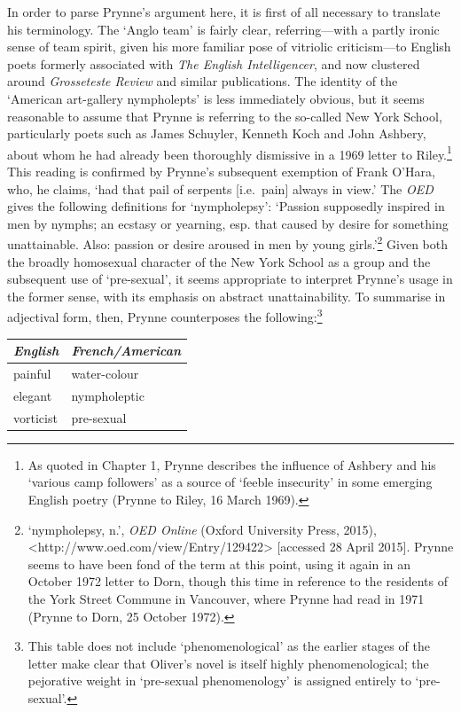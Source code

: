 \documentclass[]{article}
\begin{document}
In order to parse Prynne's argument here, it is first of all necessary
to translate his terminology. The `Anglo team' is fairly clear,
referring---with a partly ironic sense of team spirit, given his more
familiar pose of vitriolic criticism---to English poets formerly
associated with \emph{The English Intelligencer}, and now clustered
around \emph{Grosseteste Review} and similar publications. The identity
of the `American art-gallery nympholepts' is less immediately obvious,
but it seems reasonable to assume that Prynne is referring to the
so-called New York School, particularly poets such as James Schuyler,
Kenneth Koch and John Ashbery, about whom he had already been thoroughly
dismissive in a 1969 letter to Riley.\footnote{As quoted in Chapter 1,
  Prynne describes the influence of Ashbery and his `various camp
  followers' as a source of `feeble insecurity' in some emerging English
  poetry (Prynne to Riley, 16 March 1969).} This reading is confirmed by
Prynne's subsequent exemption of Frank O'Hara, who, he claims, `had that
pail of serpents {[}i.e.~pain{]} always in view.' The \emph{OED} gives
the following definitions for `nympholepsy': `Passion supposedly
inspired in men by nymphs; an ecstasy or yearning, esp. that caused by
desire for something unattainable. Also: passion or desire aroused in
men by young girls.'\footnote{`nympholepsy, n.', \emph{OED Online}
  (Oxford University Press, 2015),
  \textless{}http://www.oed.com/view/Entry/129422\textgreater{}
  {[}accessed 28 April 2015{]}. Prynne seems to have been fond of the
  term at this point, using it again in an October 1972 letter to Dorn,
  though this time in reference to the residents of the York Street
  Commune in Vancouver, where Prynne had read in 1971 (Prynne to Dorn,
  25 October 1972).} Given both the broadly homosexual character of the
New York School as a group and the subsequent use of `pre-sexual', it
seems appropriate to interpret Prynne's usage in the former sense, with
its emphasis on abstract unattainability. To summarise in adjectival
form, then, Prynne counterposes the following:\footnote{This table does
  not include `phenomenological' as the earlier stages of the letter
  make clear that Oliver's novel is itself highly phenomenological; the
  pejorative weight in `pre-sexual phenomenology' is assigned entirely
  to `pre-sexual'.}

\begin{longtable}[c]{@{}ll@{}}
\toprule
\emph{English} & \emph{French/American}\tabularnewline
\midrule
\endhead
painful & water-colour\tabularnewline
elegant & nympholeptic\tabularnewline
vorticist & pre-sexual\tabularnewline
\bottomrule
\end{longtable}
\end{document}

